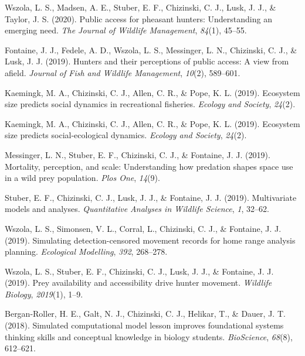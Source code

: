\documentclass[
  12pt,
]
{article}
\newlength{\cslhangindent}
\newlength{\cslentryspacingunit} %
\newenvironment{CSLReferences}[2] %
 {%
  \setlength{\parindent}{0pt}
  \ifodd #1
  \let\oldpar\par
  \def\par{\hangindent=\cslhangindent\oldpar}
  \fi
  \setlength{\parskip}{#2\cslentryspacingunit}
 }%
 {}
\begin{document}
\begin{CSLReferences}{1}{0}
\leavevmode{}%
Wszola, L. S., Madsen, A. E., Stuber, E. F., Chizinski, C. J., Lusk, J.
J., \& Taylor, J. S. (2020). Public access for pheasant hunters:
Understanding an emerging need. \emph{The Journal of Wildlife
Management}, \emph{84}(1), 45--55.

\leavevmode{}%
Fontaine, J. J., Fedele, A. D., Wszola, L. S., Messinger, L. N.,
Chizinski, C. J., \& Lusk, J. J. (2019). Hunters and their perceptions
of public access: A view from afield. \emph{Journal of Fish and Wildlife
Management}, \emph{10}(2), 589--601.

\leavevmode{}%
Kaemingk, M. A., Chizinski, C. J., Allen, C. R., \& Pope, K. L. (2019).
Ecosystem size predicts social dynamics in recreational fisheries.
\emph{Ecology and Society}, \emph{24}(2).

\leavevmode{}%
Kaemingk, M. A., Chizinski, C. J., Allen, C. R., \& Pope, K. L. (2019).
Ecosystem size predicts social-ecological dynamics. \emph{Ecology and
Society}, \emph{24}(2).

\leavevmode{}%
Messinger, L. N., Stuber, E. F., Chizinski, C. J., \& Fontaine, J. J.
(2019). Mortality, perception, and scale: Understanding how predation
shapes space use in a wild prey population. \emph{Plos One},
\emph{14}(9).

\leavevmode{}%
Stuber, E. F., Chizinski, C. J., Lusk, J. J., \& Fontaine, J. J. (2019).
Multivariate models and analyses. \emph{Quantitative Analyses in
Wildlife Science}, \emph{1}, 32--62.

\leavevmode{}%
Wszola, L. S., Simonsen, V. L., Corral, L., Chizinski, C. J., \&
Fontaine, J. J. (2019). Simulating detection-censored movement records
for home range analysis planning. \emph{Ecological Modelling},
\emph{392}, 268--278.

\leavevmode{}%
Wszola, L. S., Stuber, E. F., Chizinski, C. J., Lusk, J. J., \&
Fontaine, J. J. (2019). Prey availability and accessibility drive hunter
movement. \emph{Wildlife Biology}, \emph{2019}(1), 1--9.

\leavevmode{}%
Bergan-Roller, H. E., Galt, N. J., Chizinski, C. J., Helikar, T., \&
Dauer, J. T. (2018). Simulated computational model lesson improves
foundational systems thinking skills and conceptual knowledge in biology
students. \emph{BioScience}, \emph{68}(8), 612--621.


\end{CSLReferences}
\end{document}
